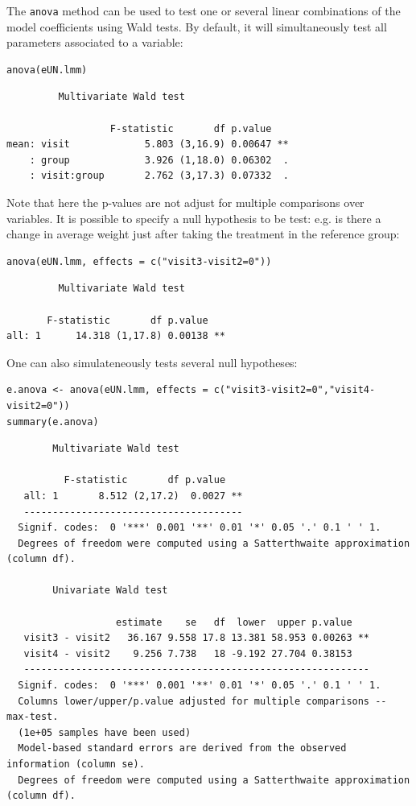 \documentclass[12pt]{article}
\begin{document}
The \texttt{anova} method can be used to test one or several linear
combinations of the model coefficients using Wald tests. By default,
it will simultaneously test all parameters associated to a variable:
\lstset{language=r,label= ,caption= ,captionpos=b,numbers=none}
\begin{lstlisting}
anova(eUN.lmm)
\end{lstlisting}

\begin{verbatim}
	     Multivariate Wald test 

                  F-statistic       df p.value   
mean: visit             5.803 (3,16.9) 0.00647 **
    : group             3.926 (1,18.0) 0.06302  .
    : visit:group       2.762 (3,17.3) 0.07332  .
\end{verbatim}


Note that here the p-values are not adjust for multiple comparisons
over variables. It is possible to specify a null hypothesis to be
test: e.g. is there a change in average weight just after taking the
treatment in the reference group:
\lstset{language=r,label= ,caption= ,captionpos=b,numbers=none}
\begin{lstlisting}
anova(eUN.lmm, effects = c("visit3-visit2=0"))
\end{lstlisting}

\begin{verbatim}
	     Multivariate Wald test 

       F-statistic       df p.value   
all: 1      14.318 (1,17.8) 0.00138 **
\end{verbatim}


One can also simulateneously tests several null hypotheses:
\lstset{language=r,label= ,caption= ,captionpos=b,numbers=none}
\begin{lstlisting}
e.anova <- anova(eUN.lmm, effects = c("visit3-visit2=0","visit4-visit2=0"))
summary(e.anova)
\end{lstlisting}

\begin{verbatim}
		Multivariate Wald test 

          F-statistic       df p.value   
   all: 1       8.512 (2,17.2)  0.0027 **
   -------------------------------------- 
  Signif. codes:  0 '***' 0.001 '**' 0.01 '*' 0.05 '.' 0.1 ' ' 1.
  Degrees of freedom were computed using a Satterthwaite approximation (column df). 

		Univariate Wald test 

                   estimate    se   df  lower  upper p.value   
   visit3 - visit2   36.167 9.558 17.8 13.381 58.953 0.00263 **
   visit4 - visit2    9.256 7.738   18 -9.192 27.704 0.38153   
   ------------------------------------------------------------ 
  Signif. codes:  0 '***' 0.001 '**' 0.01 '*' 0.05 '.' 0.1 ' ' 1.
  Columns lower/upper/p.value adjusted for multiple comparisons -- max-test.
  (1e+05 samples have been used)
  Model-based standard errors are derived from the observed information (column se). 
  Degrees of freedom were computed using a Satterthwaite approximation (column df).
\end{verbatim}
\end{document}
